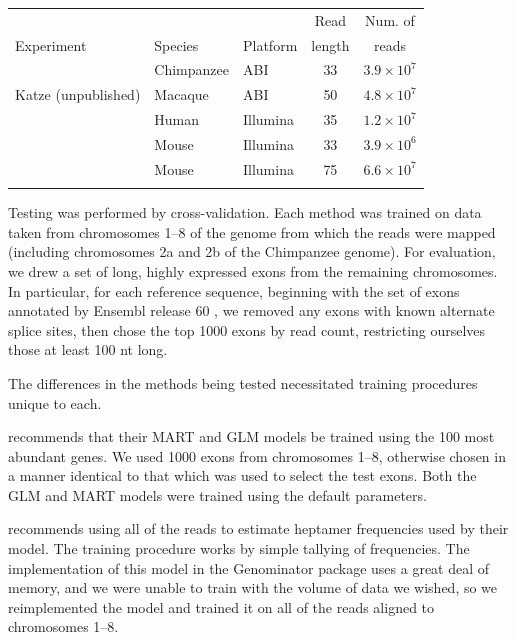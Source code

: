 \documentclass{bioinfo}
\begin{document}
\begin{table}
{
\begin{tabular}{lllcc}\toprule
 & & & Read & Num. of \\
Experiment & Species & Platform & length & reads \\\midrule
\citet{Wetterbom2010} & Chimpanzee & ABI & 33 & $3.9 \times 10^7$ \\
Katze (unpublished) & Macaque & ABI & 50  & $4.8 \times 10^7$ \\
\citet{Bullard2010} & Human & Illumina & 35 & $1.2 \times 10^7$ \\
\citet{Mortazavi2008} & Mouse & Illumina & 33 & $3.9 \times 10^6$ \\
\citet{Trapnell2010} & Mouse & Illumina & 75 & $6.6 \times 10^7$ \\\botrule
\end{tabular}
}{}
\end{table}


Testing was performed by cross-validation. Each method was trained on data taken
from chromosomes 1--8 of the genome from which the reads were mapped (including
chromosomes 2a and 2b of the Chimpanzee genome). For evaluation, we drew a set
of long, highly expressed exons from the remaining chromosomes. In particular, for
each reference sequence, beginning with the set of exons annotated by Ensembl
release 60 \cite{Hubbard2009}, we removed any exons with known alternate splice
sites, then chose the top 1000 exons by read count, restricting ourselves those
at least 100 nt long.

The differences in the methods being tested necessitated training procedures
unique to each.

\citet{Li2010} recommends that their MART and GLM models be trained using the
100 most abundant genes. We used 1000 exons from chromosomes 1--8, otherwise
chosen in a manner identical to that which was used to select the test exons.
Both the GLM and MART models were trained using the default parameters.

\citet{Hansen2010} recommends using all of the reads to estimate heptamer
frequencies used by their model. The training procedure works by simple tallying
of frequencies. The implementation of this model in the Genominator package
uses a great deal of memory, and we were unable to train with the volume of
data we wished, so we reimplemented the model and trained it on all of the reads
aligned to chromosomes 1--8.
\end{document}
